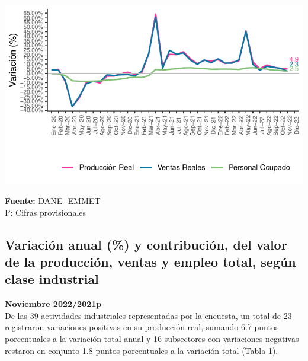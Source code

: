 \documentclass[
]{article}
\begin{document}
\begin{center}\includegraphics{boletin_files/figure-latex/historico-1} \end{center}

\textbf{Fuente:} DANE- EMMET\\
P: Cifras provisionales\\

\hypertarget{variaciuxf3n-anual-y-contribuciuxf3n-del-valor-de-la-producciuxf3n-ventas-y-empleo-total-seguxfan-clase-industrial}{%
\subsection{Variación anual (\%) y contribución, del valor de la
producción, ventas y empleo total, según clase
industrial}\label{variaciuxf3n-anual-y-contribuciuxf3n-del-valor-de-la-producciuxf3n-ventas-y-empleo-total-seguxfan-clase-industrial}}

\textbf{Noviembre 2022/2021p}\\

De las 39 actividades industriales representadas por la encuesta, un
total de 23 registraron variaciones positivas en su producción real,
sumando 6.7 puntos porcentuales a la variación total anual y 16
subsectores con variaciones negativas restaron en conjunto 1.8 puntos
porcentuales a la variación total (Tabla 1).
\end{document}
